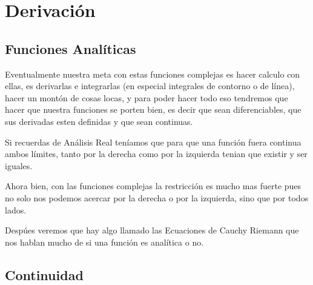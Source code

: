 \documentclass[12pt, fleqn]{report}                             %
\theoremstyle{break}                                            %
\begin{document}
               


    \chapter{Derivación}
        \clearpage


   



        \section{Funciones Analíticas}

            Eventualmente nuestra meta con estas funciones complejas es hacer 
            calculo con ellas, es derivarlas e integrarlas (en especial integrales
            de contorno o de línea), hacer un montón de cosas locas, y para poder
            hacer todo eso tendremos que hacer que nuestra funciones se porten bien,
            es decir que sean diferenciables, que sus derivadas esten definidas y
            que sean continuas.

            Si recuerdas de Análisis Real teníamos que para que una función fuera 
            continua ambos límites, tanto por la derecha como por la izquierda 
            tenian que existir y ser iguales.

            Ahora bien, con las funciones complejas la restricción es mucho mas fuerte
            pues no solo nos podemos acercar por la derecha o por la izquierda, sino que 
            por todos lados.

            Despúes veremos que hay algo llamado las Ecuaciones de Cauchy Riemann que
            nos hablan mucho de si una función es analítica o no.


        \section{Continuidad}
\end{document}
